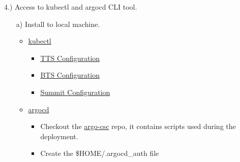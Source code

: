 \newpage

4.) Access to kubectl and argocd CLI tool.

\begin{itemize}
	\item[a)] Install to local machine.
	\begin{itemize}
		\item \href{https://kubernetes.io/docs/tasks/tools/#kubectl}{kubectl}
		\begin{itemize}
			\item \href{https://obs-controls.lsst.io/System-Testing-Deployments-and-Upgrades/Control-System-Upgrade/Deployment-Activities/tucson-teststand/index.html#resources}{TTS Configuration}
			\item \href{https://obs-controls.lsst.io/System-Testing-Deployments-and-Upgrades/Control-System-Upgrade/Deployment-Activities/base-teststand/index.html#deployment-activities-bts-resources}{BTS Configuration}
			\item \href{https://obs-controls.lsst.io/System-Testing-Deployments-and-Upgrades/Control-System-Upgrade/Deployment-Activities/summit/index.html#resources}{Summit Configuration}
		\end{itemize}
		\item \href{https://argo-cd.readthedocs.io/en/stable/cli\_installation/}{argocd}
		\begin{itemize}
			\item Checkout the \href{https://github.com/lsst-ts/argocd-csc}{argo-csc} repo, it contains scripts used during the deployment.
			\item Create the \$HOME/.argocd\_auth file 
		\end{itemize}
	\end{itemize}
\end{itemize}
